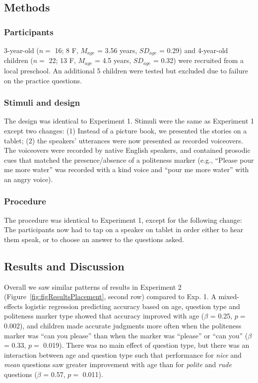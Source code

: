 \documentclass[oneside]{report}
\begin{document}
\subsection{Methods}\label{methods-1}

\subsubsection{Participants}\label{participants-1}

3-year-old (\(n=\) 16; 8 F, \(M_{age}\) = 3.56 years, \(SD_{age}\) =
0.29) and 4-year-old children (\(n=\) 22; 13 F, \(M_{age}\) = 4.5 years,
\(SD_{age}\) = 0.32) were recruited from a local preschool. An
additional 5 children were tested but excluded due to failure on the
practice questions.

\subsubsection{Stimuli and design}\label{stimuli-and-design-1}

The design was identical to Experiment 1. Stimuli were the same as
Experiment 1 except two changes: (1) Instead of a picture book, we
presented the stories on a tablet; (2) the speakers' utterances were now
presented as recorded voiceovers. The voiceovers were recorded by native
English speakers, and contained prosodic cues that matched the
presence/absence of a politeness marker (e.g., ``Please pour me more
water'' was recorded with a kind voice and ``pour me more water'' with
an angry voice).

\subsubsection{Procedure}\label{procedure-1}

The procedure was identical to Experiment 1, except for the following
change: The participants now had to tap on a speaker on tablet in order
either to hear them speak, or to choose an answer to the questions
asked.

\subsection{Results and Discussion}\label{results-and-discussion-1}

Overall we saw similar patterns of results in Experiment 2
(Figure~\ref{fig:figResultsPlacement}, second row) compared to Exp. 1. A
mixed-effects logistic regression predicting accuracy based on age,
question type and politeness marker type showed that accuracy improved
with age (\(\beta\) = 0.25, \(p =\) 0.002), and children made accurate
judgments more often when the politeness marker was ``can you please''
than when the marker was ``please'' or ``can you'' (\(\beta\) = 0.33,
\(p =\) 0.019). There was no main effect of question type, but there was
an interaction between age and question type such that performance for
\emph{nice} and \emph{mean} questions saw greater improvement with age
than for \emph{polite} and \emph{rude} questions (\(\beta\) = 0.57,
\(p =\) 0.011).
\end{document}
